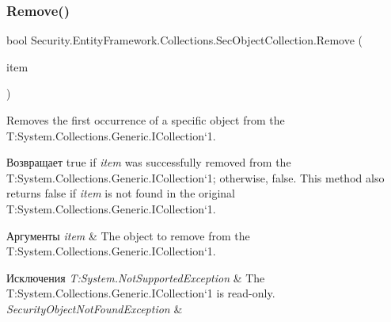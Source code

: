 \subsubsection{\texorpdfstring{Remove()}{Remove()}}
{\footnotesize\ttfamily bool Security.\+Entity\+Framework.\+Collections.\+Sec\+Object\+Collection.\+Remove (\begin{DoxyParamCaption}\item[{\hyperlink{interface_security_1_1_interfaces_1_1_model_1_1_i_sec_object}{I\+Sec\+Object}}]{item }\end{DoxyParamCaption})}



Removes the first occurrence of a specific object from the T\+:\+System.\+Collections.\+Generic.\+I\+Collection`1. 

\begin{DoxyReturn}{Возвращает}
true if {\itshape item}  was successfully removed from the T\+:\+System.\+Collections.\+Generic.\+I\+Collection`1; otherwise, false. This method also returns false if {\itshape item}  is not found in the original T\+:\+System.\+Collections.\+Generic.\+I\+Collection`1. 
\end{DoxyReturn}

\begin{DoxyParams}{Аргументы}
{\em item} & The object to remove from the T\+:\+System.\+Collections.\+Generic.\+I\+Collection`1.\\
\hline
\end{DoxyParams}

\begin{DoxyExceptions}{Исключения}
{\em T\+:\+System.\+Not\+Supported\+Exception} & The T\+:\+System.\+Collections.\+Generic.\+I\+Collection`1 is read-\/only.\\
\hline
{\em Security\+Object\+Not\+Found\+Exception} & \\
\hline
\end{DoxyExceptions}
\mbox{\label{class_security_1_1_entity_framework_1_1_collections_1_1_sec_object_collection_a709565a09ef599c45f519e9b5d226501}} 
